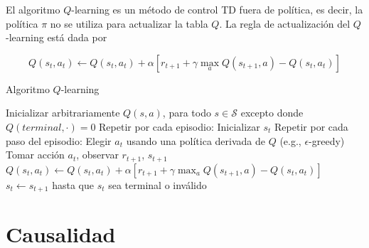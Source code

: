 
El algoritmo $Q$-learning \cite{watkins1992q} es un método de control TD fuera de política, es decir,
la política $\pi$ no se utiliza para actualizar la tabla $Q$. 
La regla de actualización del $Q$-learning está dada por 

\[
Q(s_t, a_t) \leftarrow Q(s_t, a_t) + \alpha[r_{t+1} + \gamma \max_a Q(s_{t+1}, a) - Q(s_t, a_t)]
\]

\begin{algorithm}[!hbt]
	\caption{Algoritmo $Q$-learning}
	\label{alg:q-algo}
	
	
	\SetAlgoLined\DontPrintSemicolon
    \SetAlgoHangIndent{0.5em}
	\SetAlFnt{\large} 
	
	\Input{$\alpha \in (0,1]$, $\epsilon \in (0, 1]$}
	\BlankLine
	
    Inicializar arbitrariamente $Q(s,a)$, para todo $s\in \mathcal{S}$ excepto donde $Q(terminal, \cdot) = 0$\;
	Repetir por cada episodio:\;
	\hspace{0.5cm}Inicializar $s_t$\;
	\hspace{0.5cm}Repetir por cada paso del episodio:\;
	\hspace{1cm}Elegir $a_t$ usando una política derivada de $Q$ (e.g., $\epsilon$-greedy)\;
	\hspace{1cm}Tomar acción $a_t$, observar $r_{t+1}$, $s_{t+1}$\;
	\hspace{1cm}$Q(s_t, a_t) \leftarrow Q(s_t, a_t) + \alpha [r_{t+1} + \gamma \max_a Q(s_{t+1}, a) - Q(s_t, a_t)]$\;
    \hspace{1cm}$s_t \leftarrow s_{t+1}$\;
    \hspace{0.5cm}hasta que $s_t$ sea terminal o inválido\;
\end{algorithm}


\section{Causalidad}\label{causation-section}


